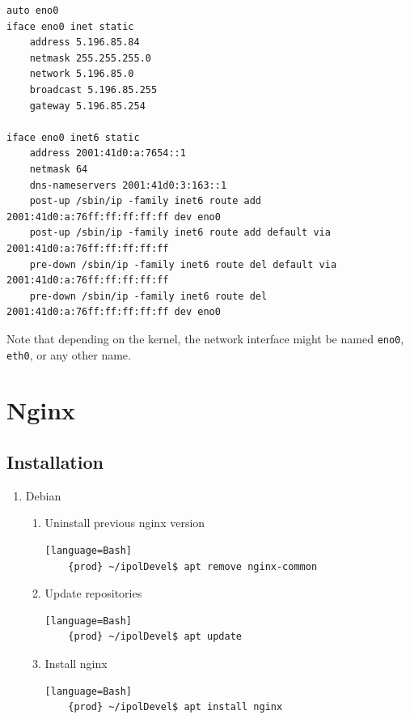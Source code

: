 \documentclass[a4paper,12pt]{article}
\begin{document}
\begin{verbatim}
auto eno0
iface eno0 inet static
    address 5.196.85.84
    netmask 255.255.255.0
    network 5.196.85.0
    broadcast 5.196.85.255
    gateway 5.196.85.254

iface eno0 inet6 static
    address 2001:41d0:a:7654::1
    netmask 64
    dns-nameservers 2001:41d0:3:163::1
    post-up /sbin/ip -family inet6 route add 2001:41d0:a:76ff:ff:ff:ff:ff dev eno0
    post-up /sbin/ip -family inet6 route add default via 2001:41d0:a:76ff:ff:ff:ff:ff
    pre-down /sbin/ip -family inet6 route del default via 2001:41d0:a:76ff:ff:ff:ff:ff
    pre-down /sbin/ip -family inet6 route del 2001:41d0:a:76ff:ff:ff:ff:ff dev eno0
\end{verbatim}

Note that depending on the kernel, the network interface might be named {\tt eno0}, {\tt eth0}, or any other name.

\section{Nginx}

\subsection{Installation}

\begin{enumerate}
\item Debian

\begin{enumerate}
    \item Uninstall previous nginx version
    \begin{verbatim}[language=Bash]
	{prod} ~/ipolDevel$ apt remove nginx-common
    \end{verbatim}

    \item Update repositories
    \begin{verbatim}[language=Bash]
    {prod} ~/ipolDevel$ apt update
    \end{verbatim}

    \item Install nginx
    \begin{verbatim}[language=Bash]
    {prod} ~/ipolDevel$ apt install nginx
    \end{verbatim}
    \end{enumerate}    
\end{enumerate}
\end{document}
